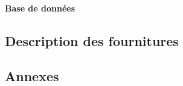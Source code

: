 \documentclass[asi]{picINSA}
\begin{document}
\subsection{Base de données}

\chapter{Description des fournitures}

\begin{appendix}
\part*{Annexes}

\listoffigures
{}
	 
\listoftables
{}
\end{appendix}
\pageQuatriemeCouverture
\end{document}
